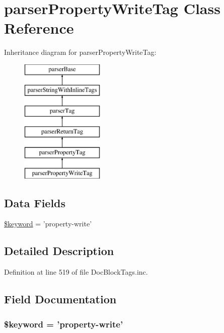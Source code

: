 \hypertarget{classparser_property_write_tag}{\section{parser\-Property\-Write\-Tag \-Class \-Reference}
\label{classparser_property_write_tag}
}
\-Inheritance diagram for parser\-Property\-Write\-Tag\-:\begin{figure}[H]
\begin{center}
\leavevmode
\includegraphics[height=6.000000cm]{classparser_property_write_tag}
\end{center}
\end{figure}
\subsection*{\-Data \-Fields}
\begin{DoxyCompactItemize}
\item 
\hyperlink{classparser_property_write_tag_a4a925d6b38bcf3957c713a7d3dc7da1f}{\$keyword} = 'property-\/write'
\end{DoxyCompactItemize}


\subsection{\-Detailed \-Description}


\-Definition at line 519 of file \-Doc\-Block\-Tags.\-inc.



\subsection{\-Field \-Documentation}
\hypertarget{classparser_property_write_tag_a4a925d6b38bcf3957c713a7d3dc7da1f}{
\subsubsection[{\$keyword}]{\setlength{\rightskip}{0pt plus 5cm}\$keyword = 'property-\/write'}}\label{classparser_property_write_tag_a4a925d6b38bcf3957c713a7d3dc7da1f}


